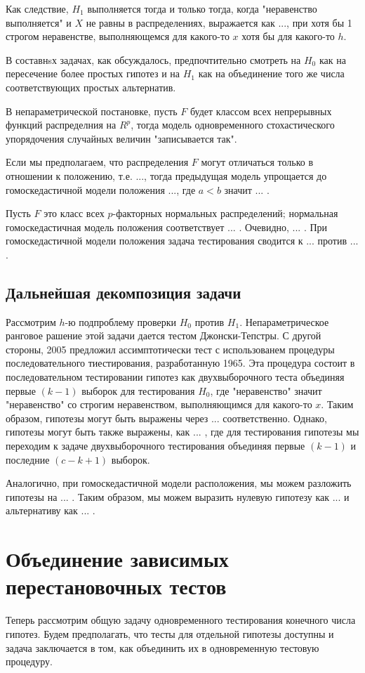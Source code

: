 \documentclass{article}
\begin{document}
Как следствие, $H_1$ выполняется тогда и только тогда, когда "неравенство выполняется" и $X$ не равны в распределениях, выражается как ..., при хотя бы 1 строгом неравенстве, выполняющемся для какого-то $x$ хотя бы для какого-то $h$.

В составнsх задачах, как обсуждалось, предпочтительно смотреть на $H_0$ как на пересечение более простых гипотез и на $H_1$ как на объединение того же числа соответствующих простых альтернатив.

В непараметрической постановке, пусть $F$ будет классом всех непрерывных функций распределния на $R^p$, тогда модель одновременного стохастического упорядочения случайных величин "записывается так".

Если мы предполагаем, что распределения $F$ могут отличаться только в отношении к положению, т.е. ..., тогда предыдущая модель упрощается до гомоскедастичной модели положения ..., где $a<b$ значит ... .

Пусть $F$ это класс всех $p$-факторных нормальных распределений; нормальная гомоскедастичная модель положения соответствует ... . Очевидно, ... . При гомоскедастичной модели положения задача тестирования сводится к ... против ... .

\subsection{Дальнейшая декомпозиция задачи}
Рассмотрим $h$-ю подпроблему проверки $H_0$ против $H_1$. Непараметрическое ранговое рашение этой задачи дается тестом Джонски-Тепстры. С другой стороны, 2005 предложил ассимптотически тест с использованем процедуры последовательного тиестирования, разработанную 1965. Эта процедура состоит в последовательном тестировании гипотез как двухвыборочного теста объединяя первые $(k-1)$ выборок для тестирования $H_0$, где "неравенство" значит "неравенство" со строгим неравенством, выполняющимся для какого-то $x$. Таким образом, гипотезы могут быть выражены через ... соответственно. Однако, гипотезы могут быть также выражены, как ... , где для тестирования гипотезы мы переходим к задаче двухвыборочного тестирования объединяя первые $(k-1)$ и последние $(c-k+1)$ выборок.

Аналогично, при  гомоскедастичной модели расположения, мы можем разложить гипотезы на ... . Таким образом, мы можем выразить нулевую гипотезу как ... и альтернативу как ... .

\section{Объединение зависимых перестановочных тестов}
Теперь рассмотрим общую задачу одновременного тестирования конечного числа гипотез. Будем предполагать, что тесты для отдельной гипотезы доступны и задача заключается в том, как объединить их в одновременную тестовую процедуру.
\end{document}

